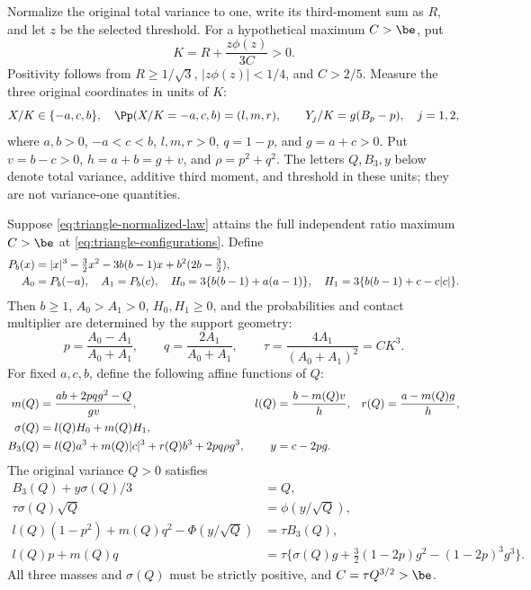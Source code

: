 Normalize the original total variance to one, write its third-moment
sum as $R$, and let $z$ be the selected threshold. For a hypothetical
maximum $C>\be$, put
\[
 K=R+\frac{z\phi(z)}{3C}>0.
\]
Positivity follows from $R\ge1/\sqrt3$, $|z\phi(z)|<1/4$, and
$C>2/5$. Measure the three original coordinates in units of $K$:
\begin{equation}\label{eq:triangle-normalized-law}
 X/K\in\{-a,c,b\},\quad \Pp(X/K=-a,c,b)=(l,m,r),
 \qquad Y_j/K=g(B_p-p),\quad j=1,2,
\end{equation}
where $a,b>0$, $-a<c<b$, $l,m,r>0$, $q=1-p$, and
$g=a+c>0$. Put $v=b-c>0$, $h=a+b=g+v$, and $\rho=p^2+q^2$.
The letters $Q,B_3,y$ below denote total variance, additive third moment,
and threshold in these units; they are not variance-one quantities.

\begin{theorem}
\label{thm:triangle-projection}
Suppose \eqref{eq:triangle-normalized-law} attains the full independent
ratio maximum $C>\be$ at \eqref{eq:triangle-configurations}. Define
\begin{align}
 P_b(x)&=|x|^3-\tfrac32x^2-3b(b-1)x+b^2(2b-\tfrac32),
                                                        \label{eq:triangle-polynomial}\\
 A_0&=P_b(-a),\quad A_1=P_b(c),\quad
 H_0=3\{b(b-1)+a(a-1)\},\quad
 H_1=3\{b(b-1)+c-c|c|\}.\notag
\end{align}
Then $b\ge1$, $A_0>A_1>0$, $H_0,H_1\ge0$, and the probabilities
and contact multiplier are determined by the support geometry:
\begin{equation}\label{eq:triangle-heights}
 p=\frac{A_0-A_1}{A_0+A_1},\qquad
 q=\frac{2A_1}{A_0+A_1},\qquad
 \tau=\frac{4A_1}{(A_0+A_1)^2}=CK^3.
\end{equation}
For fixed $a,c,b$, define the following affine functions of $Q$:
\begin{align}
 m(Q)&=\frac{ab+2pqg^2-Q}{gv},&
 l(Q)&=\frac{b-m(Q)v}{h},&
 r(Q)&=\frac{a-m(Q)g}{h},\label{eq:triangle-affine-masses}\\
 \sigma(Q)&=l(Q)H_0+m(Q)H_1,\notag\\
 B_3(Q)&=l(Q)a^3+m(Q)|c|^3+r(Q)b^3+2pq\rho g^3,
 &y&=c-2pg.\notag
\end{align}
The original variance $Q>0$ satisfies
\begin{align}
 B_3(Q)+y\sigma(Q)/3&=Q,                       \label{eq:triangle-normalization}\\
 \tau\sigma(Q)\sqrt Q&=\phi(y/\sqrt Q),        \label{eq:triangle-density}\\
 l(Q)(1-p^2)+m(Q)q^2-\Phi(y/\sqrt Q)&=\tau B_3(Q),
                                                        \label{eq:triangle-ratio}\\
 l(Q)p+m(Q)q&=\tau\{\sigma(Q)g+\tfrac32(1-2p)g^2
                                      -(1-2p)^3g^3\}. \label{eq:triangle-Bernoulli-contact}
\end{align}
All three masses and $\sigma(Q)$ must be strictly positive, and
$C=\tau Q^{3/2}>\be$.


\end{theorem}

